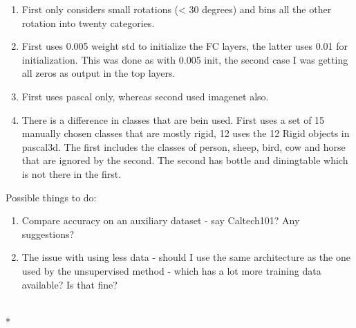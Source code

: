 \documentclass[letterpaper,10pt,english]{/usr/share/sphinx/texinputs/sphinxhowto}
\def\smaller{\fontsize{9.5pt}{9.5pt}\selectfont}
\newenvironment{ColorVerbatim}
        {\begin{mdframed}[%
            roundcorner=1.0pt, %
            backgroundcolor=nbframe-bg, %
            userdefinedwidth=1\linewidth, %
            leftmargin=0.1\linewidth, %
            innerleftmargin=0pt, %
            innerrightmargin=0pt, %
            linecolor=nbframe-border, %
            linewidth=1pt, %
            usetwoside=false, %
            everyline=true, %
            innerlinewidth=3pt, %
            innerlinecolor=nbframe-bg, %
            middlelinewidth=1pt, %
            middlelinecolor=nbframe-bg, %
            outerlinewidth=0.5pt, %
            outerlinecolor=nbframe-border, %
            needspace=0pt
        ]}
        {\end{mdframed}}
\renewenvironment{Verbatim}[1][\unskip]
        {\begin{alltt}\smaller}
        {\end{alltt}}
\begin{document}
\begin{enumerate}
\def\labelenumi{\arabic{enumi}.}
\itemsep1pt\parskip0pt
\item
  First only considers small rotations (\textless{} 30 degrees) and bins
  all the other rotation into twenty categories.
\item
  First uses 0.005 weight std to initialize the FC layers, the latter
  uses 0.01 for initialization. This was done as with 0.005 init, the
  second case I was getting all zeros as output in the top layers.
\item
  First uses pascal only, whereas second used imagenet also.
\item
  There is a difference in classes that are bein used. First uses a set
  of 15 manually chosen classes that are mostly rigid, 12 uses the 12
  Rigid objects in pascal3d. The first includes the classes of person,
  sheep, bird, cow and horse that are ignored by the second. The second
  has bottle and diningtable which is not there in the first.
\end{enumerate}Possible things to do:

\begin{enumerate}
\def\labelenumi{\arabic{enumi}.}
\itemsep1pt\parskip0pt
\item
  Compare accuracy on an auxiliary dataset - say Caltech101? Any
  suggestions?
\item
  The issue with using less data - should I use the same architecture as
  the one used by the unsupervised method - which has a lot more
  training data available? Is that fine?
\end{enumerate}


    
        \vspace{6pt}
        \makebox[0.1\linewidth]{\smaller\hfill\tt\color{nbframe-in-prompt}In\hspace{4pt}{[}{]}:\hspace{4pt}}\\*
        \vspace{-2.65\baselineskip}
        \begin{ColorVerbatim}
            \vspace{-0.7\baselineskip}
            \begin{Verbatim}[commandchars=\\\{\}]

\end{Verbatim}

            
                \vspace{0.3\baselineskip}
            
        \end{ColorVerbatim}
    

        

        \renewcommand{\indexname}{Index}
        \printindex

    
\end{document}
